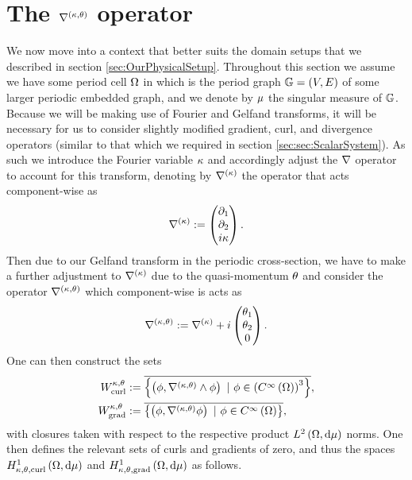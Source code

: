 \section{The $\nabla^{\left( \kappa, \theta \right)}$ operator} \label{sec:ktOperator}
We now move into a context that better suits the domain setups that we described in section \ref{sec:OurPhysicalSetup}.
Throughout this section we assume we have some period cell $\Omega$ in which is the period graph $\mathbb{G}=\left( V,E \right)$ of some larger periodic embedded graph, and we denote by $\mu$ the singular measure of $\mathbb{G}$.
Because we will be making use of Fourier and Gelfand transforms, it will be necessary for us to consider slightly modified gradient, curl, and divergence operators (similar to that which we required in section \ref{sec:sec:ScalarSystem}).
As such we introduce the Fourier variable $\kappa$ and accordingly adjust the $\nabla$ operator to account for this transform, denoting by $\nabla^{(\kappa)}$ the operator that acts component-wise as
\begin{align*}
	\nabla^{(\kappa)} := \begin{pmatrix} \partial_1 \\ \partial_2 \\ i\kappa\end{pmatrix}.
\end{align*}
Then due to our Gelfand transform in the periodic cross-section, we have to make a further adjustment to $\nabla^{(\kappa)}$ due to the quasi-momentum $\theta$ and consider the operator $\nabla^{\left( \kappa, \theta \right)}$ which component-wise is acts as
\begin{align*}
	\nabla^{\left( \kappa, \theta \right)} := \nabla^{(\kappa)} + i\begin{pmatrix} \theta_1 \\ \theta_2 \\ 0 \end{pmatrix}.
\end{align*}
One can then construct the sets
\begin{subequations} \label{eq:WktDefinitions}
	\begin{align}
		W^{\wavenumber, \qm}_{\mathrm{curl}} &:= \overline{ \clbracs{ \bracs{\phi, \ktcurl{}\phi} \ \vert \ \phi\in\bracs{\smooth{\ddom}}^3 } }, \\
		W^{\wavenumber, \qm}_{\mathrm{grad}} &:= \overline{ \clbracs{ \bracs{\phi, \ktgrad\phi} \ \vert \ \phi\in\smooth{\ddom} } },
	\end{align}
\end{subequations}
with closures taken with respect to the respective product $L^{2}\left( \Omega,\mathrm{d}\mu \right)$ norms.
One then defines the relevant sets of curls and gradients of zero, and thus the spaces $H^1_{\kappa,\theta,\mathrm{curl}}\left( \Omega, \mathrm{d}\mu \right)$ and $H^1_{\kappa,\theta,\mathrm{grad}}\left( \Omega, \mathrm{d}\mu \right)$ as follows.
